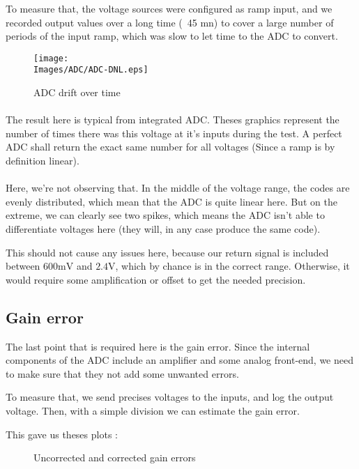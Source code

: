 To measure that, the voltage sources were configured as ramp input, and we recorded output values over
a long time (~45 mn) to cover a large number of periods of the input ramp, which was slow to let time
to the ADC to convert.

\begin{figure}[!hbt]
    \centering
    \texttt{[image: \\Images/ADC/ADC-DNL.eps]}
    \caption{ADC drift over time}
\end{figure}
\FloatBarrier

\paragraph{}
The result here is typical from integrated ADC. Theses graphics represent the number of times there was this
voltage at it's inputs during the test. 
A perfect ADC shall return the exact same number for all voltages (Since a ramp is by definition linear).

\paragraph{}
Here, we're not observing that. In the middle of the voltage range, the codes are evenly distributed, which
mean that the ADC is quite linear here. But on the extreme, we can clearly see two spikes, which means the ADC 
isn't able to differentiate voltages here (they will, in any case produce the same code).

This should not cause any issues here, because our return signal is included between $600 \si{\milli\volt}$ 
and $2.4 \si{\volt}$, which by chance is in the correct range. Otherwise, it would require some amplification
or offset to get the needed precision.


\FloatBarrier
\subsection{Gain error}
The last point that is required here is the gain error. Since the internal components of the ADC include
an amplifier and some analog front-end, we need to make sure that they not add some unwanted errors.

To measure that, we send precises voltages to the inputs, and log the output voltage.
Then, with a simple division we can estimate the gain error.

This gave us theses plots :
\begin{figure}
    \centering
    \qquad
    \caption{Uncorrected and corrected gain errors}%
\end{figure}
\FloatBarrier



